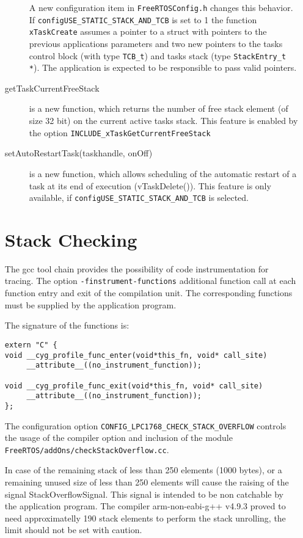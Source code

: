 \begin{enumerate}
\begin{description}
   A new configuration item in \texttt{FreeRTOSConfig.h}  changes this
   behavior. If \texttt{configUSE\_STATIC\_STACK\_AND\_TCB} is set to 1
   the function \texttt{xTaskCreate} assumes a pointer to a struct with
   pointers to the previous applications parameters and two new pointers
   to the tasks control block (with type \texttt{TCB\_t}) and tasks stack
   (type \texttt{StackEntry\_t *}). The application is expected to be
   responsible to pass valid pointers.
\item[getTaskCurrentFreeStack] is a new function, which returns the number
   of free stack element (of size 32 bit) on the current active tasks stack.
   This feature is enabled by the option
    \texttt{INCLUDE\_xTaskGetCurrentFreeStack}
\item[setAutoRestartTask(taskhandle, onOff)] is a new function, which 
    allows scheduling of the automatic restart of a task at its end of
    execution (vTaskDelete()). This feature is only available, if
    \texttt{configUSE\_STATIC\_STACK\_AND\_TCB} is selected. 
\end{description}

\section{Stack Checking}
The gcc tool chain provides the possibility of code instrumentation
for tracing. The option \texttt{-finstrument-functions} additional
function call at each function entry and exit of the compilation unit.
The corresponding functions must be supplied by the application program.

The signature of the functions is:
\begin{verbatim}
extern "C" {
void __cyg_profile_func_enter(void*this_fn, void* call_site)
     __attribute__((no_instrument_function));

void __cyg_profile_func_exit(void*this_fn, void* call_site)
     __attribute__((no_instrument_function));
};
\end{verbatim}

The configuration option \texttt{CONFIG\_LPC1768\_CHECK\_STACK\_OVERFLOW}
controls the usage of the compiler option and inclusion of the
module \texttt{FreeRTOS/addOns/checkStackOverflow.cc}.


In case of the remaining stack of less than 250 elements (1000 bytes), or a
remaining unused size of less than 250 elements will cause the raising
of the signal StackOverflowSignal. This signal is intended to be non catchable
by the application program. 
The compiler arm-non-eabi-g++ v4.9.3 proved to need approximatelly 190 stack elements to perform the stack unrolling, the limit should not be set with caution.


\end{enumerate}
